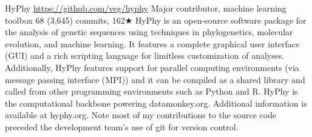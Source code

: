 {HyPhy}
{\url{https://github.com/veg/hyphy}}
{Major contributor, machine learning toolbox}
{68 (3,645) commits, 162$\bigstar$}
{
HyPhy is an open-source software package for the analysis of genetic sequences using techniques in phylogenetics, molecular evolution, and machine learning. 
It features a complete graphical user interface (GUI) and a rich scripting language for limitless customization of analyses. 
Additionally, HyPhy features support for parallel computing environments (via message passing interface (MPI)) and it can be compiled as a shared library and called from other programming environments such as Python and R. 
HyPhy is the computational backbone powering datamonkey.org. Additional information is available at hyphy.org.
Note most of my contributions to the source code preceded the development team's use of git for version control.
}



